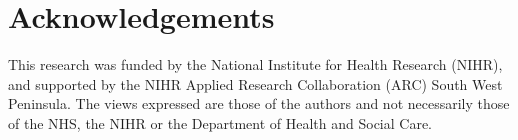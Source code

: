 \section{Acknowledgements}

This research was funded by the National Institute for Health Research (NIHR), and supported by the NIHR Applied Research Collaboration (ARC) South West Peninsula. The views expressed are those of the authors and not necessarily those of the NHS, the NIHR or the Department of Health and Social Care.

